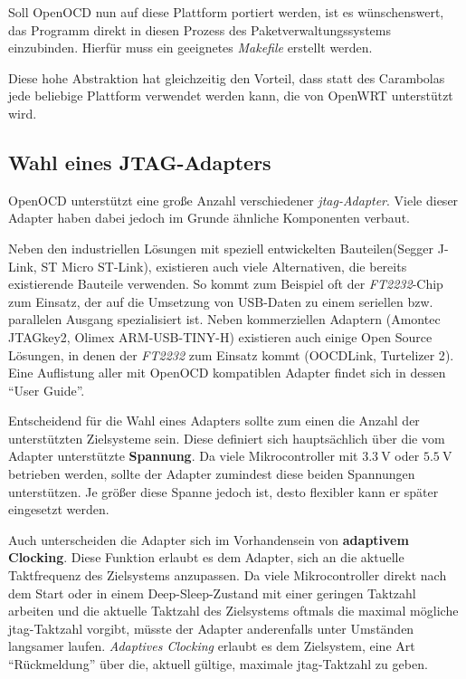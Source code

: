 Soll OpenOCD nun auf diese Plattform portiert werden, ist es wünschenswert,
das Programm direkt in diesen Prozess des Paketverwaltungssystems einzubinden.
Hierfür muss ein geeignetes \emph{Makefile} erstellt werden.

Diese hohe Abstraktion hat gleichzeitig den Vorteil, dass statt des Carambolas
jede beliebige Plattform verwendet werden kann, die von OpenWRT unterstützt
wird.

\subsection{Wahl eines JTAG-Adapters}
OpenOCD unterstützt eine große Anzahl verschiedener \emph{\gls{jtag}-Adapter}.
Viele dieser Adapter haben dabei jedoch im Grunde ähnliche Komponenten verbaut.

Neben den industriellen Lösungen mit speziell entwickelten Bauteilen(Segger
J-Link\cite{SEG}, ST Micro ST-Link\cite{STM01}), existieren auch viele
Alternativen, die bereits existierende Bauteile verwenden. So kommt zum Beispiel oft der
\emph{FT2232}-Chip zum Einsatz, der auf die Umsetzung von USB-Daten zu einem
seriellen bzw. parallelen Ausgang spezialisiert ist. Neben kommerziellen
Adaptern (Amontec JTAGkey2\cite{AMO}, Olimex ARM-USB-TINY-H\cite{OLI})
existieren auch einige Open Source Lösungen, in denen der \emph{FT2232} zum
Einsatz kommt (OOCDLink\cite{OCDL}, Turtelizer 2\cite{TURT}). Eine Auflistung
aller mit OpenOCD kompatiblen Adapter findet sich in dessen "`User Guide"'\cite{OOCD}.

Entscheidend für die Wahl eines Adapters sollte zum einen die Anzahl der
unterstützten Zielsysteme sein. Diese definiert sich hauptsächlich über die
vom Adapter unterstützte \textbf{Spannung}. Da viele Mikrocontroller mit
$\SI{3.3}{\volt}$ oder $\SI{5.5}{\volt}$ betrieben werden, sollte der Adapter
zumindest diese beiden Spannungen unterstützen. Je größer diese Spanne jedoch ist, desto flexibler kann
er später eingesetzt werden.

Auch unterscheiden die Adapter sich im Vorhandensein von \textbf{adaptivem
Clocking}. Diese Funktion erlaubt es dem Adapter, sich an die aktuelle
Taktfrequenz des Zielsystems anzupassen. Da viele Mikrocontroller direkt nach
dem Start oder in einem Deep-Sleep-Zustand mit einer geringen Taktzahl arbeiten
und die aktuelle Taktzahl des Zielsystems oftmals die maximal mögliche
\gls{jtag}-Taktzahl vorgibt, müsste der Adapter anderenfalls unter Umständen langsamer
laufen. \emph{Adaptives Clocking} erlaubt es dem Zielsystem, eine Art
"`Rückmeldung"' über die, aktuell gültige, maximale \gls{jtag}-Taktzahl zu geben.


